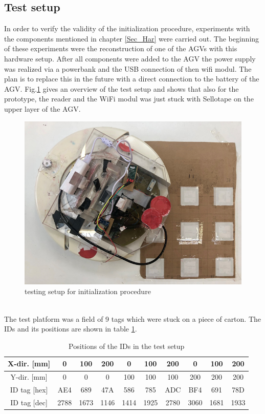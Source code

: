 \subsection{Test setup}
In order to verify the validity of the initialization procedure, experiments with the components mentioned in chapter \ref{Sec_Har} were carried out. The beginning of these experiments were the reconstruction of one of the AGVs with this hardware setup. After all components were added to the AGV the power supply was realized via a powerbank and the USB connection of then wifi modul. The plan is to replace this in the future with a direct connection to the battery of the AGV. Fig.\ref{TestSetup} gives an overview of the test setup and shows that also for the prototype, the reader and the WiFi modul was just stuck with Sellotape on the upper layer of the AGV.\\
\begin{figure}[!htbp]
\centering
\includegraphics[width = 14cm]{Pictures/TestSetup}
\caption{testing setup for initialization procedure}
\label{TestSetup}
\end{figure}\\
The test platform was a field of 9 tags which were stuck on a piece of carton. The IDs and its positions are shown in table \ref{IDs_Setup}.\\
\begin{table}[!htbp]
\begin{tabular}{|c|c|c|c|c|c|c|c|c|c|}
\hline
X-dir. [mm] & 0    & 100  & 200  & 0    & 100  & 200  & 0    & 100  & 200  \\ \hline
Y-dir. [mm] & 0    & 0    & 0    & 100  & 100  & 100  & 200  & 200  & 200  \\ \hline
ID tag [hex]    & AE4  & 689  & 47A  & 586  & 785  & ADC  & BF4  & 691  & 78D  \\ \hline
ID tag [dec]    & 2788 & 1673 & 1146 & 1414 & 1925 & 2780 & 3060 & 1681 & 1933 \\ \hline
\end{tabular}
\caption{Positions of the IDs in the test setup}
\label{IDs_Setup}
\end{table}\\
